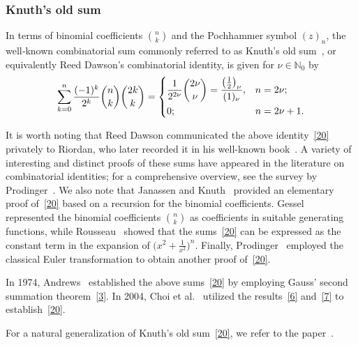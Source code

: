 \documentclass[reqno]{amsart}
\numberwithin{equation}{section}
\theoremstyle{plain}
\theoremstyle{remark}
\begin{document}
\subsubsection{Knuth's old sum}
In terms of binomial coefficients $\binom{n}{k}$ and the Pochhammer symbol $(z)_n$, the well‑known combinatorial sum commonly referred to as Knuth's old sum~\cite{28}, or equivalently Reed Dawson's combinatorial identity, is given for $\nu\in\mathbb{N}_0$ by
\begin{equation}\label{20}
\sum_{k=0}^{n}\frac{(-1)^k}{2^k}\binom{n}{k}\binom{2k}{k}
=\begin{dcases}
\frac{1}{2^{2\nu}}\binom{2\nu}{\nu}=\frac{\bigl(\frac12\bigr)_\nu}{(1)_\nu}, &n=2\nu;\\
0; &n=2\nu+1.
\end{dcases}
\end{equation}
\par
It is worth noting that Reed Dawson communicated the above identity~\eqref{20} privately to Riordan, who later recorded it in his well-known book~\cite[p.~71]{28}. A variety of interesting and distinct proofs of these sums have appeared in the literature on combinatorial identities; for a comprehensive overview, see the survey by Prodinger~\cite{21}. We also note that Janassen and Knuth~\cite{12} provided an elementary proof of~\eqref{20} based on a recursion for the binomial coefficients. Gessel~\cite{10} represented the binomial coefficients $\binom{n}{k}$ as coefficients in suitable generating functions, while Rousseau~\cite{10} showed that the sums~\eqref{20} can be expressed as the constant term in the expansion of $\bigl(x^2+\frac{1}{x^2}\bigr)^n$. Finally, Prodinger~\cite{20} employed the classical Euler transformation to obtain another proof of~\eqref{20}.
\par
In 1974, Andrews~\cite[p.~478]{1} established the above sums~\eqref{20} by employing Gauss' second summation theorem~\eqref{3}. In 2004, Choi et al.~\cite{5} utilized the results~\eqref{6} and~\eqref{7} to establish~\eqref{20}.
\par
For a natural generalization of Knuth's old sum~\eqref{20}, we refer to the paper~\cite{24}.
\end{document}
